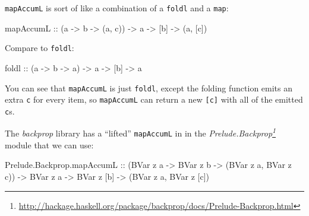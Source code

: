 \documentclass[]{article}
\newenvironment{Shaded}{}{}
\newcommand{\DataTypeTok}[1]{\textcolor[rgb]{0.56,0.13,0.00}{#1}}
\newcommand{\FunctionTok}[1]{\textcolor[rgb]{0.02,0.16,0.49}{#1}}
\newcommand{\NormalTok}[1]{#1}
\newcommand{\OtherTok}[1]{\textcolor[rgb]{0.00,0.44,0.13}{#1}}
\renewcommand{\href}[2]{#2\footnote{\url{#1}}}
\begin{document}
\texttt{mapAccumL} is sort of like a combination of a \texttt{foldl} and a
\texttt{map}:

\begin{Shaded}
\begin{Highlighting}[]
\NormalTok{mapAccumL}
\OtherTok{    ::}\NormalTok{ (a }\OtherTok{{-}\textgreater{}}\NormalTok{ b }\OtherTok{{-}\textgreater{}}\NormalTok{ (a, c))}
    \OtherTok{{-}\textgreater{}}\NormalTok{ a}
    \OtherTok{{-}\textgreater{}}\NormalTok{ [b]}
    \OtherTok{{-}\textgreater{}}\NormalTok{ (a, [c])}
\end{Highlighting}
\end{Shaded}

Compare to \texttt{foldl}:

\begin{Shaded}
\begin{Highlighting}[]
\FunctionTok{foldl}
\OtherTok{    ::}\NormalTok{ (a }\OtherTok{{-}\textgreater{}}\NormalTok{ b }\OtherTok{{-}\textgreater{}}\NormalTok{ a)}
    \OtherTok{{-}\textgreater{}}\NormalTok{ a}
    \OtherTok{{-}\textgreater{}}\NormalTok{ [b]}
    \OtherTok{{-}\textgreater{}}\NormalTok{ a}
\end{Highlighting}
\end{Shaded}

You can see that \texttt{mapAccumL} is just \texttt{foldl}, except the folding
function emits an extra \texttt{c} for every item, so \texttt{mapAccumL} can
return a new \texttt{{[}c{]}} with all of the emitted \texttt{c}s.

The \emph{backprop} library has a ``lifted'' \texttt{mapAccumL} in in the
\emph{\href{http://hackage.haskell.org/package/backprop/docs/Prelude-Backprop.html}{Prelude.Backprop}}
module that we can use:

\begin{Shaded}
\begin{Highlighting}[]
\NormalTok{Prelude.Backprop.mapAccumL}
\OtherTok{    ::}\NormalTok{ (}\DataTypeTok{BVar}\NormalTok{ z a }\OtherTok{{-}\textgreater{}} \DataTypeTok{BVar}\NormalTok{ z b }\OtherTok{{-}\textgreater{}}\NormalTok{ (}\DataTypeTok{BVar}\NormalTok{ z a, }\DataTypeTok{BVar}\NormalTok{ z c))}
    \OtherTok{{-}\textgreater{}} \DataTypeTok{BVar}\NormalTok{ z a}
    \OtherTok{{-}\textgreater{}} \DataTypeTok{BVar}\NormalTok{ z [b]}
    \OtherTok{{-}\textgreater{}}\NormalTok{ (}\DataTypeTok{BVar}\NormalTok{ z a, }\DataTypeTok{BVar}\NormalTok{ z [c])}
\end{Highlighting}
\end{Shaded}
\end{document}
